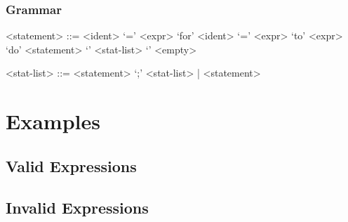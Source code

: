\documentclass{article}
\begin{document}
\setlength{\grammarparsep}{20pt plus 1pt minus 1pt} %
\setlength{\grammarindent}{12em} %

\subsubsection*{Grammar}

\begin{grammar}

<statement> ::= <ident> `=' <expr> 
\alt `for' <ident> `=' <expr> `to' <expr> `do' <statement> 
\alt `{' <stat-list> `}' 
\alt <empty> 

<stat-list> ::= <statement> `;' <stat-list> | <statement> 

\end{grammar}

%
%
%
%




\newpage
\section*{Examples}
\subsection*{Valid Expressions}


\subsection*{Invalid Expressions}
\end{document}
